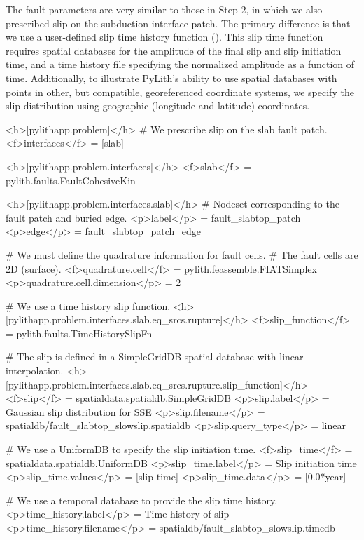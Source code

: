 The fault parameters are very similar to those in Step 2, in which we
also prescribed slip on the subduction interface patch. The primary
difference is that we use a user-defined slip time history function
(). This slip time function requires spatial
databases for the amplitude of the final slip and slip initiation
time, and a time history file specifying the normalized amplitude as a
function of time. Additionally, to illustrate PyLith's ability to use
spatial databases with points in other, but compatible, georeferenced
coordinate systems, we specify the slip distribution using geographic
(longitude and latitude) coordinates.
\begin{cfg}
<h>[pylithapp.problem]</h>
# We prescribe slip on the slab fault patch.
<f>interfaces</f> = [slab]

<h>[pylithapp.problem.interfaces]</h>
<f>slab</f> = pylith.faults.FaultCohesiveKin

<h>[pylithapp.problem.interfaces.slab]</h>
# Nodeset corresponding to the fault patch and buried edge.
<p>label</p> = fault_slabtop_patch
<p>edge</p> = fault_slabtop_patch_edge

# We must define the quadrature information for fault cells.
# The fault cells are 2D (surface).
<f>quadrature.cell</f> = pylith.feassemble.FIATSimplex
<p>quadrature.cell.dimension</p> = 2

# We use a time history slip function.
<h>[pylithapp.problem.interfaces.slab.eq_srcs.rupture]</h>
<f>slip_function</f> = pylith.faults.TimeHistorySlipFn

# The slip is defined in a SimpleGridDB spatial database with linear interpolation.
<h>[pylithapp.problem.interfaces.slab.eq_srcs.rupture.slip_function]</h>
<f>slip</f> = spatialdata.spatialdb.SimpleGridDB
<p>slip.label</p> = Gaussian slip distribution for SSE
<p>slip.filename</p> = spatialdb/fault_slabtop_slowslip.spatialdb
<p>slip.query_type</p> = linear

# We use a UniformDB to specify the slip initiation time.
<f>slip_time</f> = spatialdata.spatialdb.UniformDB
<p>slip_time.label</p> = Slip initiation time
<p>slip_time.values</p> = [slip-time]
<p>slip_time.data</p> = [0.0*year] 

# We use a temporal database to provide the slip time history.
<p>time_history.label</p> = Time history of slip
<p>time_history.filename</p> = spatialdb/fault_slabtop_slowslip.timedb
\end{cfg}

